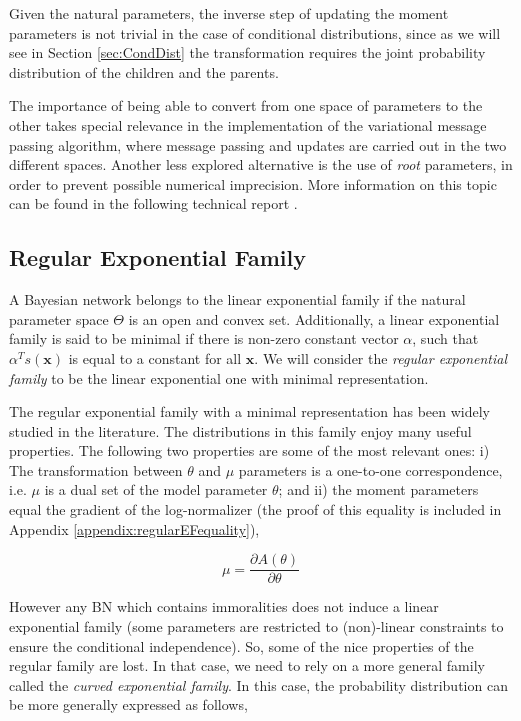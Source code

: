 \documentclass[11pt, oneside]{article}   	%
\newcommand{\bm}{\mathbf}
\numberwithin{figure}{section}
\numberwithin{equation}{section}
\numberwithin{table}{section}
\theoremstyle{definition}
\begin{document}
Given the natural parameters, the inverse step of updating the moment parameters is not trivial in the case of conditional distributions, since as we will see in Section \ref{sec:CondDist} the transformation requires the joint probability distribution of the children and the parents. 

The importance of being able to convert from one space of parameters to the other takes special relevance in the implementation of the variational message passing algorithm, where message passing and updates are carried out in the two different spaces. Another less explored alternative is the use of \textit{root} parameters, in order to prevent possible numerical imprecision. More information on this topic can be found in the following technical report \cite{HowJeb05}.

\subsection*{Regular Exponential Family}

A Bayesian network belongs to the linear exponential family if the natural parameter space $\Theta$ is an open and convex set. Additionally, a linear exponential family is said to be minimal if there is non-zero constant vector $\alpha$, such that $\alpha^Ts(\bm x)$ is equal to a constant for all $\bm x$.  We will consider the \textit{regular exponential family} to be the linear exponential one with minimal representation.


The regular exponential family with a minimal representation has been widely studied in the literature. The distributions in this family enjoy many useful properties. The following two properties are some of the most relevant ones: i)  The transformation between $\theta$ and $\mu$ parameters is a one-to-one correspondence, i.e. $\mu$ is a dual set of the model parameter $\theta$; and ii) the moment parameters equal the gradient of the log-normalizer (the proof of this equality is included in Appendix \ref{appendix:regularEFequality}), 

\begin{equation}
\label{Equation:RegularEFEquality}
\mu = \frac{\partial A(\theta)}{\partial \theta}
\end{equation}


However any BN which contains immoralities does not induce a linear exponential family (some parameters are restricted to (non)-linear constraints to ensure the conditional independence). So, some of the nice properties of the regular family are lost. In that case, we need to rely on a more general family called the \textit{curved exponential family}. In this case, the probability distribution can be more generally expressed as follows, 
\end{document}
